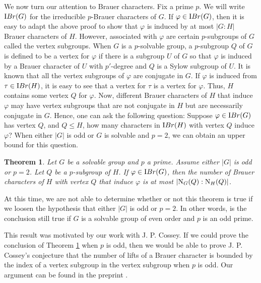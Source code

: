 \documentclass[12pt]{article}
\newtheorem{theorem}{Theorem}%
\def\ibr#1{{\textrm IBr} (#1)}
\def\norm#1#2{{\textrm N}_{#1} (#2)}
\def\phi{\varphi}
\begin{document}
We now turn our attention to Brauer characters.  Fix a prime $p$. We
will write $\ibr G$ for the irreducible $p$-Brauer characters of
$G$.  If $\phi \in \ibr G$, then it is easy to adapt the above proof
to show that $\phi$ is induced by at most $|G:H|$ Brauer characters
of $H$.  However, associated with $\phi$ are certain $p$-subgroups
of $G$ called the vertex subgroups.  When $G$ is a $p$-solvable
group, a $p$-subgroup $Q$ of $G$ is defined to be a vertex for
$\phi$ if there is a subgroup $U$ of $G$ so that $\phi$ is induced
by a Brauer character of $U$ with $p'$-degree and $Q$ is a Sylow
subgroup of $U$.  It is known that all the vertex subgroups of
$\phi$ are conjugate in $G$. If $\phi$ is induced from $\tau \in
\ibr H$, it is easy to see that a vertex for $\tau$ is a vertex for
$\phi$.  Thus, $H$ contains some vertex $Q$ for $\phi$.  Now,
different Brauer characters of $H$ that induce $\phi$ may have
vertex subgroups that are not conjugate in $H$ but are necessarily
conjugate in $G$. Hence, one can ask the following question: Suppose
$\phi \in \ibr G$ has vertex $Q$, and $Q \le H$, how many characters
in $\ibr H$ with vertex $Q$ induce $\phi$?  When either $|G|$ is odd
or $G$ is solvable and $p = 2$, we can obtain an upper bound for
this question.

\begin{theorem} \label{main}
Let $G$ be a solvable group and $p$ a prime.  Assume either $|G|$ is
odd or $p = 2$. Let $Q$ be a $p$-subgroup of $H$. If $\phi \in \ibr
G$, then the number of Brauer characters of $H$ with vertex $Q$ that
induce $\phi$ is at most $|\norm GQ:\norm HQ|$.
\end{theorem}

At this time, we are not able to determine whether or not this
theorem is true if we loosen the hypothesis that either $|G|$ is odd
or $p = 2$.  In other words, is the conclusion still true if $G$ is
a solvable group of even order and $p$ is an odd prime. 





This result
was motivated by our work with J. P. Cossey. If we could prove the
conclusion of Theorem \ref{main} when $p$ is odd, then we would be
able to prove J. P. Cossey's conjecture that the number of lifts of
a Brauer character is bounded by the index of a vertex subgroup in
the vertex subgroup when $p$ is odd. Our argument can be found in
the preprint \cite{preprint}.
\end{document}
